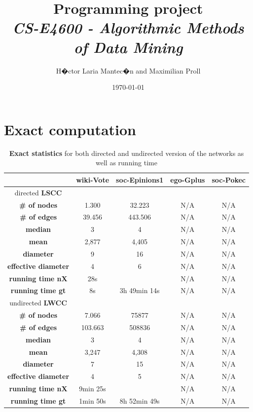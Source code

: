 \documentclass[12pt,a4paper]{article}
\title{\textbf{ Programming project} \\ \textit{CS-E4600 - Algorithmic Methods of Data Mining}}
\author{H�ctor Laria Mantec�n and Maximilian Proll}
\date{\today}
\begin{document}
\maketitle

%

\section{Exact computation}


\begin{table}[h!]
\centering
\caption{\textbf{Exact statistics} for both directed and undirected version of the networks as well as running time}
\begin{tabular}{c|c|c|c|c}
	& \textbf{wiki-Vote}	& \textbf{soc-Epinions1}	& \textbf{ego-Gplus}	&	\textbf{soc-Pokec}\\ \hline
directed \textbf{LSCC}	& 	& 	& 	&	\\ \hline
\textbf{\# of nodes} 		&1.300 			&32.223				&N/A				&N/A	\\
\textbf{\# of edges} 		&39.456 			&443.506				&N/A				&N/A	\\
\textbf{median} 			&3	 			&4					&N/A				&N/A	\\
\textbf{mean} 			&2,877 			&4,405				&N/A				&N/A	\\
\textbf{diameter} 		&9	 			&16					&N/A				&N/A	\\
\textbf{effective diameter} 	&4	 			&6					&N/A				&N/A	\\
\textbf{running time nX}	&28s				&					&N/A				&N/A	\\
\textbf{running time gt}	&8s				&3h 49min 14s			&N/A				&N/A	\\ \hline
undirected \textbf{LWCC}	& 	& 	& 	&	\\ \hline
\textbf{\# of nodes} 		&7.066 			&75877				&N/A				&N/A	\\
\textbf{\# of edges} 		&103.663			&508836				&N/A				&N/A	\\
\textbf{median} 			&3	 			&4					&N/A				&N/A	\\
\textbf{mean} 			&3,247 			&4,308				&N/A				&N/A	\\
\textbf{diameter} 		&7	 			&15					&N/A				&N/A	\\
\textbf{effective diameter} 	&4	 			&5					&N/A				&N/A	\\
\textbf{running time nX} 	&9min 25s		&					&N/A				&N/A	\\
\textbf{running time gt} 	&1min 50s		&8h 52min 49s			&N/A				&N/A
\end{tabular}
\label{tab:exactstatistics}
\end{table}
\end{document}
